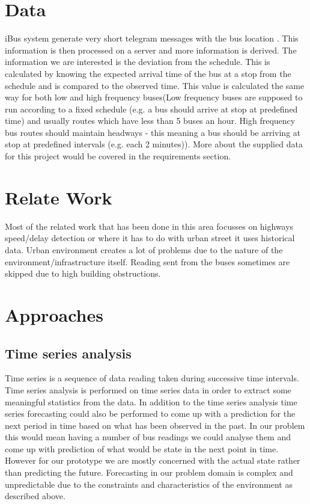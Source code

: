 \section{Data}
	iBus system generate very short telegram messages with the bus location \cite{Hounsell201276}.
This information is then processed on a server and more information is derived.
The information we are interested is the deviation from the schedule. This is
calculated by knowing the expected arrival time of the bus at a stop from
the schedule and is compared to the observed time. This value is calculated
the same way for both low and high frequency buses(Low frequency buses are
supposed to run according to a fixed schedule (e.g. a bus should arrive at stop
at predefined time) and usually routes which have less than 5 buses an hour.
High frequency bus routes should maintain headways - this meaning a bus
should be arriving at stop at predefined intervals (e.g. each 2 minutes)). More
about the supplied data for this project would be covered in the requirements
section.

\section{Relate Work}
Most of the related work that has been done in this area focusses on highways speed/delay detection or where it has to do with urban street it uses historical data. Urban environment creates a lot of problems due to the nature of the environment/infrastructure itself. Reading sent from the buses sometimes are skipped due to high building obstructions.

\section{Approaches}
	\subsection{Time series analysis}
	Time series is a sequence of data reading taken during successive time intervals. Time series analysis is performed on time series data in order to extract some meaningful statistics from the data. In addition to the time series analysis time series forecasting could also be performed to come up with a prediction for the next period in time based on what has been observed in the past. In our problem this would mean having a number of bus readings we could analyse them and come up with prediction of what would be state in the next point in time. However for our prototype we are mostly concerned with the actual state rather than predicting the future. Forecasting in our problem domain is complex and unpredictable due to the constraints and characteristics of the environment as described above.
